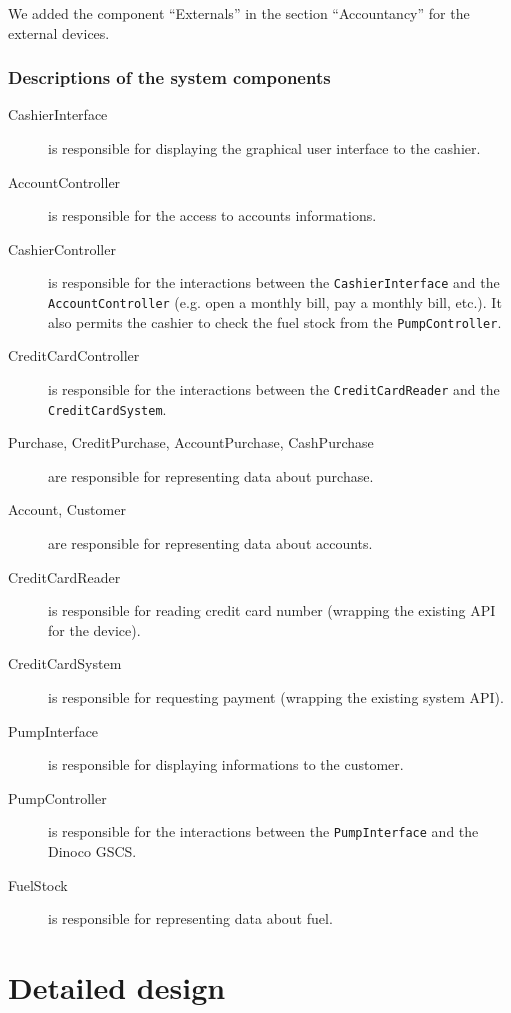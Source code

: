 \documentclass[11pt, a4paper]{article}
\newcommand{\settextlisting}{\lstset{ basicstyle=\small\ttfamily }}
\begin{document}
We added the component ``Externals'' in the section ``Accountancy'' for the external devices. \\


\subsubsection*{Descriptions of the system components}
\settextlisting
\begin{description}
\item[CashierInterface] is responsible for displaying the graphical user interface to the cashier.

\item[AccountController] is responsible for the access to accounts informations.


\item[CashierController] is responsible for the interactions between the \lstinline|CashierInterface| and the \lstinline|AccountController| (e.g. open a monthly bill, pay a monthly bill, etc.). It also permits the cashier to check the fuel stock from the \lstinline|PumpController|.

\item[CreditCardController] is responsible for the interactions between the \lstinline|CreditCardReader| and the \lstinline|CreditCardSystem|.


\item[Purchase, CreditPurchase, AccountPurchase, CashPurchase] are responsible for representing data about purchase.
\item[Account, Customer] are responsible for representing data about accounts.
\item[CreditCardReader] is responsible for reading credit card number (wrapping the existing API for the device).
\item[CreditCardSystem] is responsible for requesting payment (wrapping the existing system API).

\item[PumpInterface] is responsible for displaying informations to the customer.
\item[PumpController] is responsible for the interactions between the \lstinline|PumpInterface| and the Dinoco GSCS.
\item[FuelStock] is responsible for representing data about fuel.
\end{description}

\section{Detailed design}
\end{document}
